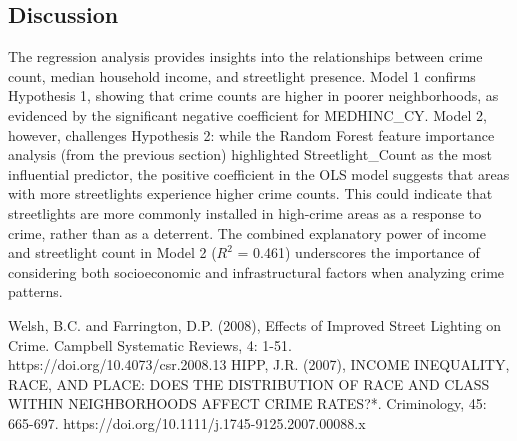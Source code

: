 \documentclass{report}
\begin{document}
\subsection{Discussion}
\par The regression analysis provides insights into the relationships between crime count, median household income, and streetlight presence. Model 1 confirms Hypothesis 1, showing that crime counts are higher in poorer neighborhoods, as evidenced by the significant negative coefficient for MEDHINC\_CY. Model 2, however, challenges Hypothesis 2: while the Random Forest feature importance analysis (from the previous section) highlighted Streetlight\_Count as the most influential predictor, the positive coefficient in the OLS model suggests that areas with more streetlights experience higher crime counts. This could indicate that streetlights are more commonly installed in high-crime areas as a response to crime, rather than as a deterrent. The combined explanatory power of income and streetlight count in Model 2 ($R^2$ = 0.461) underscores the importance of considering both socioeconomic and infrastructural factors when analyzing crime patterns.

\begin{thebibliography}{9}
  Welsh, B.C. and Farrington, D.P. (2008), Effects of Improved Street Lighting on Crime. Campbell Systematic Reviews, 4: 1-51. https://doi.org/10.4073/csr.2008.13
  HIPP, J.R. (2007), INCOME INEQUALITY, RACE, AND PLACE: DOES THE DISTRIBUTION OF RACE AND CLASS WITHIN NEIGHBORHOODS AFFECT CRIME RATES?*. Criminology, 45: 665-697. https://doi.org/10.1111/j.1745-9125.2007.00088.x
\end{thebibliography}
\end{document}
